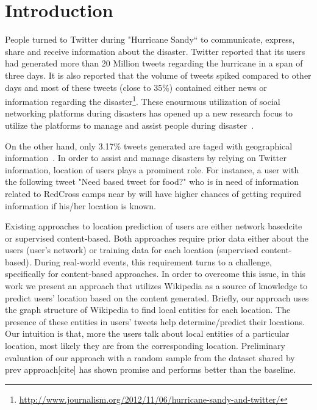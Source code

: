 \section{Introduction}
\label{sec:Introduction}

People turned to Twitter during "Hurricane Sandy`` to communicate, express, share and receive information about the disaster. Twitter reported that its users had generated more than 20 Million tweets regarding the hurricane in a span of three days. It is also reported that the volume of tweets spiked compared to other days and most of these tweets (close to 35\%) contained either news or information regarding the disaster\footnote{\url{http://www.journalism.org/2012/11/06/hurricane-sandy-and-twitter/}}. These enourmous utilization of social networking platforms during disasters has opened up a new research focus to utilize the platforms to manage and assist people during disaster~\cite{purohit2013emergency}. 

On the other hand, only 3.17\% tweets generated are taged with geographical information~\cite{morstatter2013sample}. In order to assist and manage disasters by relying on Twitter information, location of users plays a prominent role. For instance, a user with the following tweet "Need based tweet for food?" who is in need of information related to RedCross camps near by will have higher chances of getting required information if his/her location is known.  

Existing approaches to location prediction of users are either network based{cite} or supervised content-based{}. Both approaches require prior data either about the users (user's network) or training data for each location (supervised content-based). During real-world events, this requirement turns to a challenge, specifically for content-based approaches. In order to overcome this issue, in this work we present an approach that utilizes Wikipedia as a source of knowledge to predict users' location based on the content generated. Briefly, our approach uses the graph structure of Wikipedia to find local entities for each location. The presence of these entities in users' tweets help determine/predict their locations. Our intuition is that, more the users talk about local entities of a particular location, most likely they are from the corresponding location. Preliminary evaluation of our approach with a random sample from the dataset shared by prev approach[cite] has shown promise and performs better than the baseline.   

